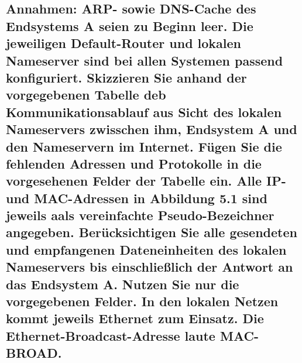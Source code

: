 \documentclass[a4paper]{article}
\begin{document}
\subsection{Annahmen: ARP- sowie DNS-Cache des Endsystems A seien zu Beginn leer. Die jeweiligen Default-Router und lokalen Nameserver sind bei allen Systemen passend konfiguriert. Skizzieren Sie anhand der vorgegebenen Tabelle deb Kommunikationsablauf aus Sicht des lokalen Nameservers zwisschen ihm, Endsystem A und den Nameservern im Internet. Fügen Sie die fehlenden Adressen und Protokolle in die vorgesehenen Felder der Tabelle ein. Alle IP- und MAC-Adressen in Abbildung 5.1 sind jeweils aals vereinfachte Pseudo-Bezeichner angegeben. Berücksichtigen Sie alle gesendeten und empfangenen Dateneinheiten des lokalen Nameservers bis einschließlich der Antwort an das Endsystem A. Nutzen Sie nur die vorgegebenen Felder. In den lokalen Netzen kommt jeweils Ethernet zum Einsatz. Die Ethernet-Broadcast-Adresse laute MAC-BROAD.}
\pagebreak
{}
\end{document}

